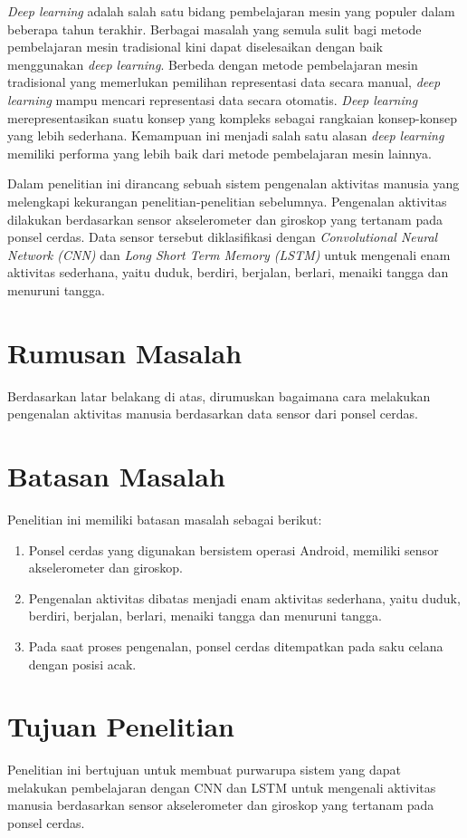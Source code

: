 \textit{Deep learning} adalah salah satu bidang pembelajaran mesin yang populer dalam beberapa tahun terakhir. Berbagai masalah yang semula sulit bagi metode pembelajaran mesin tradisional kini dapat diselesaikan dengan baik menggunakan \textit{deep learning}. Berbeda dengan metode pembelajaran mesin tradisional yang memerlukan pemilihan representasi data secara manual, \textit{deep learning} mampu mencari representasi data secara otomatis. \textit{Deep learning} merepresentasikan suatu konsep yang kompleks sebagai rangkaian konsep-konsep yang lebih sederhana. Kemampuan ini menjadi salah satu alasan \textit{deep learning} memiliki performa yang lebih baik dari metode pembelajaran mesin lainnya.

Dalam penelitian ini dirancang sebuah sistem pengenalan aktivitas manusia yang melengkapi kekurangan penelitian-penelitian sebelumnya. Pengenalan aktivitas dilakukan berdasarkan sensor akselerometer dan giroskop yang tertanam pada ponsel cerdas. Data sensor tersebut diklasifikasi dengan \textit{Convolutional Neural Network (CNN)} dan \textit{Long Short Term Memory (LSTM)} untuk mengenali enam aktivitas sederhana, yaitu duduk, berdiri, berjalan, berlari, menaiki tangga dan menuruni tangga.

\section{Rumusan Masalah}
Berdasarkan latar belakang di atas, dirumuskan bagaimana cara melakukan pengenalan aktivitas manusia berdasarkan data sensor dari ponsel cerdas.

\section{Batasan Masalah}
Penelitian ini memiliki batasan masalah sebagai berikut:

\begin{enumerate}
    \item Ponsel cerdas yang digunakan bersistem operasi Android, memiliki sensor akselerometer dan giroskop.
    \item Pengenalan aktivitas dibatas menjadi enam aktivitas sederhana, yaitu duduk, berdiri, berjalan, berlari, menaiki tangga dan menuruni tangga.
    \item Pada saat proses pengenalan, ponsel cerdas ditempatkan pada saku celana dengan posisi acak.
\end{enumerate}

\section{Tujuan Penelitian}
Penelitian ini bertujuan untuk membuat purwarupa sistem yang dapat melakukan pembelajaran dengan CNN dan LSTM untuk mengenali aktivitas manusia berdasarkan sensor akselerometer dan giroskop yang tertanam pada ponsel cerdas.

